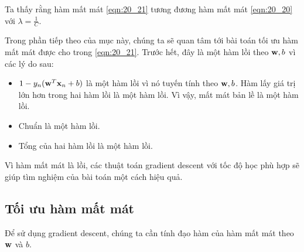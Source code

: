 Ta thấy rằng hàm mất mát \eqref{eqn:20_21} tương đương hàm mất mát
\eqref{eqn:20_20} với $\lambda = \frac{1}{C}$.

Trong phần tiếp theo của mục này, chúng ta sẽ quan tâm tới bài toán tối ưu hàm
mất mát được cho trong \eqref{eqn:20_21}. Trước hết, đây là một hàm lồi theo
$\mathbf{w}, b$ vì các lý do sau:
\begin{itemize}
\item $1 - y_n(\mathbf{w}^T\mathbf{x}_n + b)$ là một hàm lồi vì nó tuyến tính theo $\mathbf{w}, b$. Hàm lấy giá trị lớn hơn trong hai hàm lồi là một hàm lồi. Vì
vậy, mất mát bản lề là một hàm lồi.

\item Chuẩn là một hàm lồi.

\item Tổng của hai hàm lồi là một hàm lồi.

\end{itemize}
Vì hàm mất mát là lồi, các thuật toán gradient descent với tốc độ học phù hợp sẽ giúp tìm nghiệm của bài toán một cách hiệu quả.

\subsection{Tối ưu hàm mất mát}
Để sử dụng gradient descent, chúng ta cần
tính đạo hàm của hàm mất mát theo $\mathbf{w}$ và $b$.

